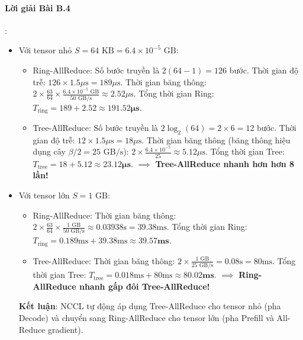 \paragraph{Lời giải Bài B.4}:
\begin{itemize}
  \item[a)] Với tensor nhỏ $S = 64\text{ KB} = 6.4 \times 10^{-5}\text{ GB}$:
  \begin{itemize}
    \item Ring-AllReduce: Số bước truyền là $2(64 - 1) = 126$ bước.
    Thời gian độ trễ: $126 \times 1.5\mu\text{s} = 189\mu\text{s}$.
    Thời gian băng thông: $2 \times \frac{63}{64} \times \frac{6.4 \times 10^{-5}\text{ GB}}{50\text{ GB/s}} \approx 2.52\mu\text{s}$.
    Tổng thời gian Ring: $T_{\text{ring}} = 189 + 2.52 \approx \mathbf{191.52\mu\text{s}}$.
    \item Tree-AllReduce: Số bước truyền là $2 \log_2(64) = 2 \times 6 = 12$ bước.
    Thời gian độ trễ: $12 \times 1.5\mu\text{s} = 18\mu\text{s}$.
    Thời gian băng thông (băng thông hiệu dụng cây $\beta/2 = 25\text{ GB/s}$): $2 \times \frac{6.4 \times 10^{-5}}{25} \approx 5.12\mu\text{s}$.
    Tổng thời gian Tree: $T_{\text{tree}} = 18 + 5.12 \approx \mathbf{23.12\mu\text{s}}$.
    $\implies$ \textbf{Tree-AllReduce nhanh hơn hơn 8 lần!}
  \end{itemize}

  \item[b)] Với tensor lớn $S = 1\text{ GB}$:
  \begin{itemize}
    \item Ring-AllReduce: Thời gian băng thông: $2 \times \frac{63}{64} \times \frac{1\text{ GB}}{50\text{ GB/s}} \approx 0.03938\text{s} = 39.38\text{ms}$.
    Tổng thời gian Ring: $T_{\text{ring}} = 0.189\text{ms} + 39.38\text{ms} \approx \mathbf{39.57\text{ms}}$.
    \item Tree-AllReduce: Thời gian băng thông: $2 \times \frac{1\text{ GB}}{25\text{ GB/s}} = 0.08\text{s} = 80\text{ms}$.
    Tổng thời gian Tree: $T_{\text{tree}} = 0.018\text{ms} + 80\text{ms} \approx \mathbf{80.02\text{ms}}$.
    $\implies$ \textbf{Ring-AllReduce nhanh gấp đôi Tree-AllReduce!}
  \end{itemize}
  \textbf{Kết luận}: NCCL tự động áp dụng Tree-AllReduce cho tensor nhỏ (pha Decode) và chuyển sang Ring-AllReduce cho tensor lớn (pha Prefill và All-Reduce gradient).
\end{itemize}

